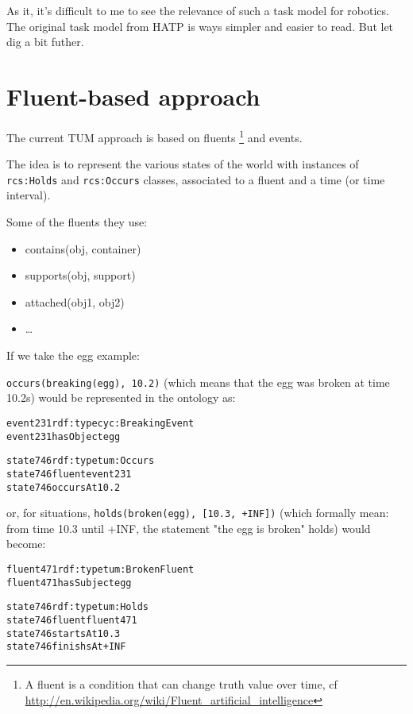 As it, it's difficult to me to see the relevance of such a task model for
robotics. The original task model from HATP is ways simpler and easier to read.
But let dig a bit futher.


\section{Fluent-based approach}

The current TUM approach is based on fluents \footnote{A fluent is a condition
that can change truth value over time, cf
\url{http://en.wikipedia.org/wiki/Fluent_artificial_intelligence}} and events.

The idea is to represent the various states of the world with instances of {\tt
rcs:Holds} and {\tt rcs:Occurs} classes, associated to a fluent and a time (or
time interval).

Some of the fluents they use:


\begin{itemize}
\item  contains(obj, container)
\item  supports(obj, support)
\item  attached(obj1, obj2)
\item  \ldots{}
\end{itemize}
If we take the egg example:

{\tt occurs(breaking(egg), 10.2)} (which means that the egg was broken at time
10.2s) would be represented in the ontology as:



\begin{alltt}

event231 rdf:type cyc:BreakingEvent
event231 hasObject egg

state746 rdf:type tum:Occurs
state746 fluent event231
state746 occursAt 10.2

\end{alltt}

or, for situations, {\tt holds(broken(egg), [10.3, +INF])} (which formally
mean: from time 10.3 until +INF, the statement "the egg is broken" holds) would
become:



\begin{alltt}

fluent471 rdf:type tum:BrokenFluent
fluent471 hasSubject egg

state746 rdf:type tum:Holds
state746 fluent fluent471
state746 startsAt 10.3
state746 finishsAt +INF

\end{alltt}

